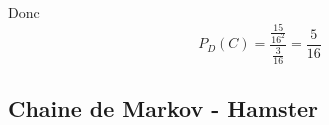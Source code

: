 \begin{correction}
\begin{enumerate}
\begin{enumerate}
Donc $$P_D(C) = \frac{\frac{15}{16^2}}{\frac{3}{16}}= \frac{5}{16}$$

\end{enumerate}
\end{enumerate}
\end{correction}




\subsection{Chaine de Markov - Hamster}



